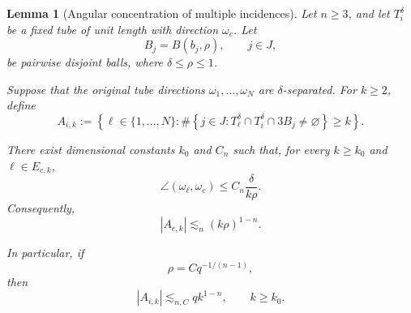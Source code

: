 \documentclass[11pt, letterpaper]{nyjm}
\newtheorem{lemma}[theorem]{Lemma}
\begin{document}
	 \begin{lemma}[Angular concentration of multiple incidences] \label{lem:overlap-fixed-parent}
	 	Let \(n\ge3\), and let \(T_i^\delta\) be a
	 	fixed tube of unit length with direction
	 	\(\omega_c\). Let
	 	\[
	 	B_j=B(b_j,\rho),\qquad j\in J,
	 	\]
	 	be pairwise disjoint balls, where
	 	\(\delta\le\rho\le1\).
	 	
	 	Suppose that the original tube directions
	 	\(\omega_1,\ldots,\omega_N\) are
	 	\(\delta\)-separated. For \(k\ge2\), define
	 	\[
	 	A_{i,k}:=
	 	\left\{
	 	\ell\in\{1,\ldots,N\}:
	 	\#\left\{
	 	j\in J:
	 	T_\ell^\delta\cap T_i^\delta
	 	\cap 3B_j\ne\varnothing
	 	\right\}\ge k
	 	\right\}.
	 	\]
	 	
	 	There exist dimensional constants
	 	\(k_0\) and \(C_n\) such that, for
	 	every \(k\ge k_0\) and
	 	\(\ell\in E_{c,k}\),
	 	\[
	 	\angle(\omega_\ell,\omega_c)
	 	\le C_n\frac{\delta}{k\rho}.
	 	\]
	 	Consequently,
	 	\[
	 	|A_{c,k}|
	 	\lesssim_n (k\rho)^{1-n}.
	 	\]
	 	
	 	In particular, if
	 	\[
	 	\rho=Cq^{-1/(n-1)},
	 	\]
	 	then
	 	\[
	 	|A_{i,k}|
	 	\lesssim_{n,C}qk^{1-n},
	 	\qquad k\ge k_0.
	 	\]
	 \end{lemma}
	 
\end{document}
